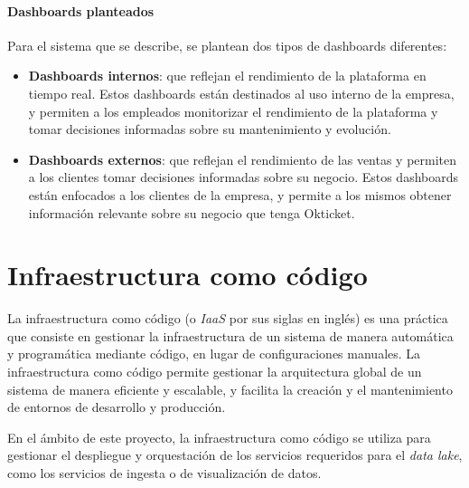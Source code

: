 \newpage{}
\paragraph{Dashboards planteados}
Para el sistema que se describe, se plantean dos tipos de dashboards diferentes:

\begin{itemize}
	\item \textbf{Dashboards internos}: que reflejan el rendimiento de la plataforma en tiempo real.
		Estos dashboards están destinados al uso interno de la empresa, y permiten a los
		empleados monitorizar el rendimiento de la plataforma y tomar decisiones informadas
		sobre su mantenimiento y evolución.
	\item \textbf{Dashboards externos}: que reflejan el rendimiento de las ventas y permiten a los
	    clientes tomar decisiones informadas sobre su negocio. Estos dashboards están enfocados
		a los clientes de la empresa, y permite a los mismos obtener información relevante sobre
		su negocio que tenga Okticket.
\end{itemize}


\section{Infraestructura como código}
La infraestructura como código (o \textit{IaaS} por sus siglas en inglés) es una práctica que consiste
en gestionar la infraestructura de un sistema de manera automática y programática mediante código,
en lugar de configuraciones manuales. La infraestructura como código permite gestionar la arquitectura
global de un sistema de manera eficiente y escalable, y facilita la creación y el mantenimiento de entornos
de desarrollo y producción.

En el ámbito de este proyecto, la infraestructura como código se utiliza para gestionar el despliegue y
orquestación de los servicios requeridos para el \textit{data lake}, como los servicios de ingesta o de
visualización de datos.
